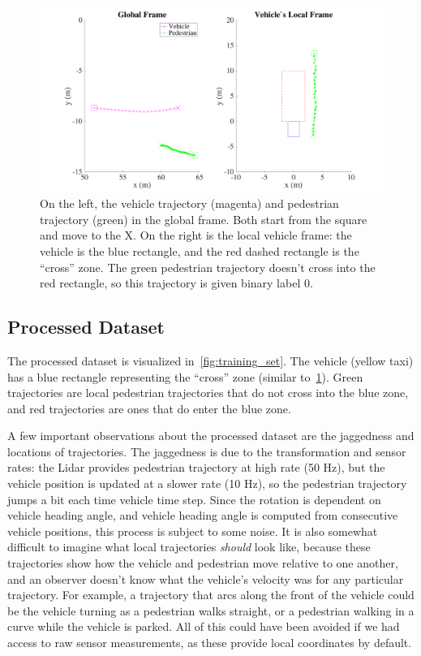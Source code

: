 \begin{figure}
	\centering
	\includegraphics [trim=0 0 0 0, clip, angle=0, width=0.8\columnwidth,
	keepaspectratio]{figures/global_to_local}
	\caption{On the left, the vehicle trajectory (magenta) and pedestrian trajectory (green) in the global frame. Both start from the square and move to the X. On the right is the local vehicle frame: the vehicle is the blue rectangle, and the red dashed rectangle is the ``cross'' zone. The green pedestrian trajectory doesn't cross into the red rectangle, so this trajectory is given binary label 0.} 
	\label{fig:global_to_local_matlab} 
\end{figure}

\subsection{Processed Dataset}

The processed dataset is visualized in~\cref{fig:training_set}.
The vehicle (yellow taxi) has a blue rectangle representing the ``cross'' zone (similar to~\cref{fig:global_to_local_matlab}).
Green trajectories are local pedestrian trajectories that do not cross into the blue zone, and red trajectories are ones that do enter the blue zone.

A few important observations about the processed dataset are the jaggedness and locations of trajectories.
The jaggedness is due to the transformation and sensor rates: the Lidar provides pedestrian trajectory at high rate (50 Hz), but the vehicle position is updated at a slower rate (10 Hz), so the pedestrian trajectory jumps a bit each time vehicle time step.
Since the rotation is dependent on vehicle heading angle, and vehicle heading angle is computed from consecutive vehicle positions, this process is subject to some noise.
It is also somewhat difficult to imagine what local trajectories \textit{should} look like, because these trajectories show how the vehicle and pedestrian move relative to one another, and an observer doesn't know what the vehicle's velocity was for any particular trajectory.
For example, a trajectory that arcs along the front of the vehicle could be the vehicle turning as a pedestrian walks straight, or a pedestrian walking in a curve while the vehicle is parked.
All of this could have been avoided if we had access to raw sensor measurements, as these provide local coordinates by default.

